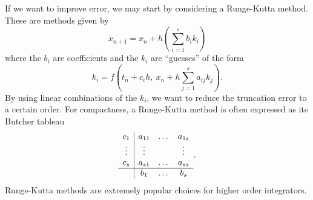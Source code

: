 \documentclass{report}
\theoremstyle{exampstyle} \newtheorem{example}[theorem]{Example}
\theoremstyle{exampstyle} \newtheorem{remark}[theorem]{Remark}
\theoremstyle{exampstyle} \newtheorem{definition}[theorem]{Definition}
\theoremstyle{exampstyle} \newtheorem{lemma}[theorem]{Lemma}
\begin{document}
If we want to improve error, we may start by considering a Runge-Kutta method.
These are methods given by
\begin{equation*}
	x_{n+1} = x_n + h \left( \sum_{i = 1}^{s} b_i k_i \right)
\end{equation*}
where the $b_i$ are coefficients and the $k_i$ are ``guesses'' of the form
\begin{equation*}
	k_i = f \left( t_n + c_i h,~ x_n + h\sum_{j = 1}^{s} a_{ij}k_j \right).	
\end{equation*}
By using linear combinations of the $k_i$, we want to reduce the truncation error to a certain order.
For compactness, a Runge-Kutta method is often expressed as its Butcher tableau
\begin{equation*}
	\begin{array}{c|ccc}
		c_1  &a_{11} &\dots &a_{1s} \\
		\vdots &\vdots & &\vdots \\
		c_s &a_{s1} &\dots &a_{ss} \\
		\hline
		&b_1 &\dots &b_s
	\end{array}.
\end{equation*}
Runge-Kutta methods are extremely popular choices for higher order integrators.
\end{document}
